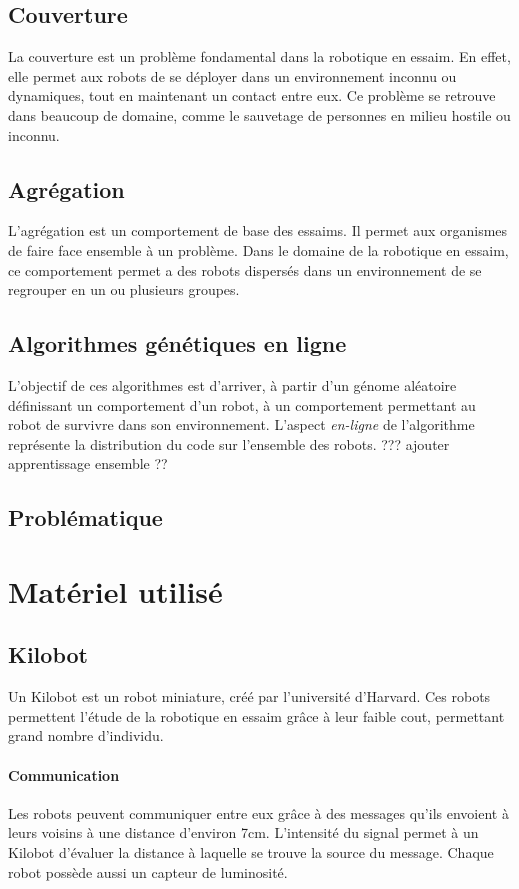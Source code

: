 \documentclass[a4paper]{article}
\begin{document}
\subsection{Couverture}
La couverture est un problème fondamental dans la robotique en essaim. En effet, elle permet aux robots de se déployer dans un environnement inconnu ou dynamiques, tout en maintenant un contact entre eux. Ce problème se retrouve dans beaucoup de domaine, comme le sauvetage de personnes en milieu hostile ou inconnu.
\subsection{Agrégation}
L'agrégation est un comportement de base des essaims. Il permet aux organismes de faire face ensemble à un problème. Dans le domaine de la robotique en essaim, ce comportement permet a des robots dispersés dans un environnement de se regrouper en un ou plusieurs groupes.
\subsection{Algorithmes génétiques en ligne}
L'objectif de ces algorithmes est d'arriver, à partir d'un génome aléatoire définissant un comportement d'un robot, à un comportement permettant au robot de survivre dans son environnement. L'aspect \textit{en-ligne} de l'algorithme représente la distribution du code sur l'ensemble des robots. ??? ajouter apprentissage ensemble ??
\subsection{Problématique}
\newpage
\section{Matériel utilisé}
\subsection{Kilobot}
Un Kilobot est un robot miniature, créé par l'université d'Harvard. Ces robots permettent l'étude de la robotique en essaim grâce à leur faible cout, permettant grand nombre d'individu.
\paragraph{Communication}Les robots peuvent communiquer entre eux grâce à des messages qu'ils envoient à leurs voisins à une distance d'environ 7cm. L'intensité du signal permet à un Kilobot d'évaluer la distance à laquelle se trouve la source du message. Chaque robot possède aussi un capteur de luminosité.
\end{document}

